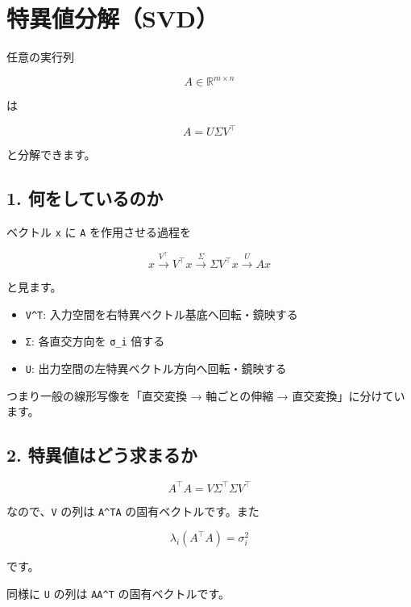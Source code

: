 \documentclass[
  11pt,
  a4paper,
]{ltjsarticle}
\author{}
\date{}
\providecommand{\tightlist}{%
  \setlength{\itemsep}{0pt}\setlength{\parskip}{0pt}}
\begin{document}
\hypertarget{ux7279ux7570ux5024ux5206ux89e3svd}{%
\section{特異値分解（SVD）}\label{ux7279ux7570ux5024ux5206ux89e3svd}}

任意の実行列

\[
A\in\mathbb{R}^{m\times n}
\]

は

\[
\boxed{A=U\Sigma V^\top}
\]

と分解できます。

\hypertarget{ux4f55ux3092ux3057ux3066ux3044ux308bux306eux304b}{%
\subsection{1.
何をしているのか}\label{ux4f55ux3092ux3057ux3066ux3044ux308bux306eux304b}}

ベクトル \texttt{x} に \texttt{A} を作用させる過程を

\[
x\xrightarrow{V^\top}V^\top x\xrightarrow{\Sigma}\Sigma V^\top x\xrightarrow{U}Ax
\]

と見ます。

\begin{itemize}
\tightlist
\item
  \texttt{V\^{}T}: 入力空間を右特異ベクトル基底へ回転・鏡映する
\item
  \texttt{Σ}: 各直交方向を \texttt{σ\_i} 倍する
\item
  \texttt{U}: 出力空間の左特異ベクトル方向へ回転・鏡映する
\end{itemize}

つまり一般の線形写像を「直交変換 → 軸ごとの伸縮 →
直交変換」に分けています。

\hypertarget{ux7279ux7570ux5024ux306fux3069ux3046ux6c42ux307eux308bux304b}{%
\subsection{2.
特異値はどう求まるか}\label{ux7279ux7570ux5024ux306fux3069ux3046ux6c42ux307eux308bux304b}}

\[
A^\top A=V\Sigma^\top\Sigma V^\top
\]

なので、\texttt{V} の列は \texttt{A\^{}TA} の固有ベクトルです。また

\[
\lambda_i(A^\top A)=\sigma_i^2
\]

です。

同様に \texttt{U} の列は \texttt{AA\^{}T} の固有ベクトルです。
\end{document}

